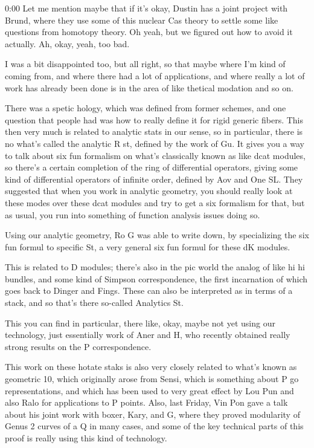 \begin{unfinished}{0:00}
Let me mention maybe that if it's okay, Dustin has a joint project with Brund, where they use some of this nuclear Cas theory to settle some like questions from homotopy theory. Oh yeah, but we figured out how to avoid it actually. Ah, okay, yeah, too bad.

I was a bit disappointed too, but all right, so that maybe where I'm kind of coming from, and where there had a lot of applications, and where really a lot of work has already been done is in the area of like thetical modation and so on.

There was a spetic hology, which was defined from former schemes, and one question that people had was how to really define it for rigid generic fibers. This then very much is related to analytic stats in our sense, so in particular, there is no what's called the analytic R st, defined by the work of Gu. It gives you a way to talk about six fun formalism on what's classically known as like dcat modules, so there's a certain completion of the ring of differential operators, giving some kind of differential operators of infinite order, defined by Aov and One SL. They suggested that when you work in analytic geometry, you should really look at these modes over these dcat modules and try to get a six formalism for that, but as usual, you run into something of function analysis issues doing so.

Using our analytic geometry, Ro G was able to write down, by specializing the six fun formul to specific St, a very general six fun formul for these dK modules.

This is related to D modules; there's also in the pic world the analog of like hi hi bundles, and some kind of Simpson correspondence, the first incarnation of which goes back to Dinger and Fings. These can also be interpreted as in terms of a stack, and so that's there so-called Analytics St.

This you can find in particular, there like, okay, maybe not yet using our technology, just essentially work of Aner and H, who recently obtained really strong results on the P correspondence.

This work on these hotate staks is also very closely related to what's known as geometric 10, which originally arose from Sensi, which is something about P go representations, and which has been used to very great effect by Lou Pun and also Ralo for applications to P points. Also, last Friday, Vin Pon gave a talk about his joint work with boxer, Kary, and G, where they proved modularity of Genus 2 curves of a Q in many cases, and some of the key technical parts of this proof is really using this kind of technology.


\end{unfinished}
